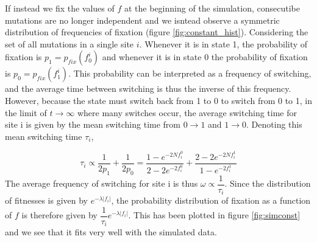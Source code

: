 \documentclass{article}
\begin{document}
If instead we fix the values of $f$ at the beginning of the simulation, consecutibe mutations are no longer independent and we isntead observe a symmetric distribution of frequencies of fixation (figure \ref{fig:constant_hist}). Considering the set of all mutations in a single site $i$. Whenever it is in state 1, the probability of fixation is $p_1 = p_{fix}(f_0^i)$ and whenever it is in state 0 the probability of fixation is $p_0 = p_{fix}(f_1^i)$. This probability can be interpreted as a frequency of switching, and the average time between switching is thus the inverse of this frequency. However, because the state must switch back from 1 to 0 to switch from 0 to 1, in the limit of $t \rightarrow \infty$ where many switches occur, the average switching time for site i is given by the mean switching time from $0 \rightarrow 1$ and $1 \rightarrow 0$. Denoting this mean switching time $\tau_i$,

\begin{equation}
\tau_i \propto \dfrac{1}{2p_1} + \dfrac{1}{2p_0} = \dfrac{1- e^{-2 N f_i^0}}{2- 2e^{-2 f_i^0}} + \dfrac{2- 2e^{-2 N f_i^1}}{1- e^{-2 f_i^1}}
\end{equation}
The average frequency of switching for site i is thus $\omega \propto \dfrac{1}{\tau_i}$.
Since the distribution of fitnesses is given by $e^{-\lambda |f_i|}$, the probability distribution of fixation as a function of $f$ is therefore given by $\dfrac{1}{\tau_i} e^{-\lambda |f_i|} $.
This has been plotted in figure \ref{fig:simconst} and we see that it fits very well with the simulated data.
\end{document}
